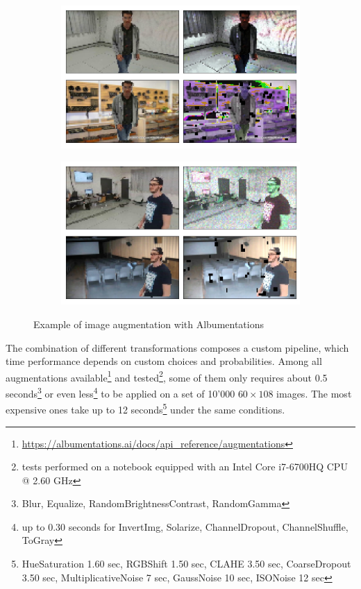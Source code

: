 \begin{figure}[!h]
	\begin{center}
		\begin{subfigure}[h]{0.49\textwidth}
			\centering
			\includegraphics[width=1\textwidth]{"contents/images/05-imgaug-example-1"}
		\end{subfigure}
		\hfill
		\begin{subfigure}[h]{0.49\textwidth}
			\centering
			\includegraphics[width=1\textwidth]{"contents/images/05-imgaug-example-2"}
		\end{subfigure}
	\end{center}
	\vspace{-0.5cm}
	\caption[Example of image augmentation with Albumentations]{Example of image augmentation with Albumentations}
	\label{fig:albumentation-example}
\end{figure}

The combination of different transformations composes a custom pipeline, which time performance depends on custom choices and probabilities. Among all augmentations available\footnote{\url{https://albumentations.ai/docs/api_reference/augmentations}} and tested\footnote{tests performed on a notebook equipped with an Intel Core i7-6700HQ CPU @ 2.60 GHz}, some of them only requires about 0.5 seconds\footnote{Blur, Equalize, RandomBrightnessContrast, RandomGamma} or even less\footnote{up to 0.30 seconds for InvertImg, Solarize, ChannelDropout, ChannelShuffle, ToGray} to be applied on a set of 10'000 $60 \times 108$ images. The most expensive ones take up to 12 seconds\footnote{HueSaturation 1.60 sec, RGBShift 1.50 sec, CLAHE 3.50 sec, CoarseDropout 3.50 sec, MultiplicativeNoise 7 sec, GaussNoise 10 sec, ISONoise 12 sec} under the same conditions.


